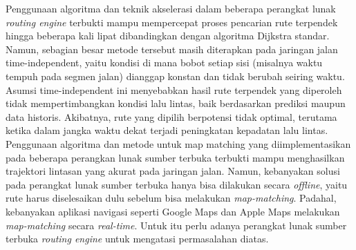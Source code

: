 Penggunaan algoritma dan teknik akselerasi dalam beberapa perangkat lunak \textit{routing engine} terbukti mampu mempercepat proses pencarian rute terpendek hingga beberapa kali lipat dibandingkan dengan algoritma Dijkstra standar. Namun, sebagian besar metode tersebut masih diterapkan pada jaringan jalan time-independent, yaitu kondisi di mana bobot setiap sisi (misalnya waktu tempuh pada segmen jalan) dianggap konstan dan tidak berubah seiring waktu. Asumsi time-independent ini menyebabkan hasil rute terpendek yang diperoleh tidak mempertimbangkan kondisi lalu lintas, baik berdasarkan prediksi maupun data historis. Akibatnya, rute yang dipilih berpotensi tidak optimal, terutama ketika dalam jangka waktu dekat terjadi peningkatan kepadatan lalu lintas. Penggunaan algoritma dan metode untuk map matching yang diimplementasikan pada beberapa perangkan lunak sumber terbuka terbukti mampu menghasilkan trajektori lintasan yang akurat pada jaringan jalan. Namun, kebanyakan solusi pada perangkat lunak sumber terbuka hanya bisa dilakukan secara \textit{offline}, yaitu rute harus diselesaikan dulu sebelum bisa melakukan \textit{map-matching}. Padahal, kebanyakan aplikasi navigasi seperti Google Maps dan Apple Maps melakukan \textit{map-matching} secara \textit{real-time}. Untuk itu perlu adanya perangkat lunak sumber terbuka \textit{routing engine} untuk mengatasi permasalahan diatas.

